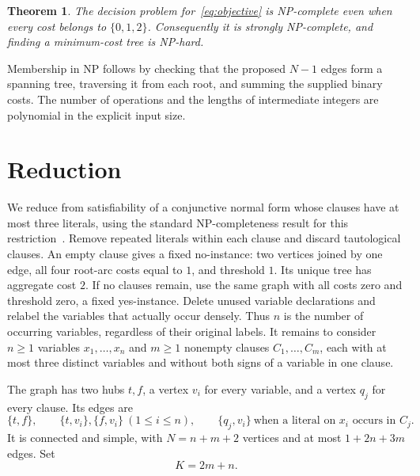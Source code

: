 \documentclass[11pt]{article}
\newtheorem{theorem}{Theorem}
\begin{document}
\begin{theorem}\label{thm:main}
The decision problem for~\eqref{eq:objective} is NP-complete even when
every cost belongs to $\{0,1,2\}$. Consequently it is strongly NP-complete,
and finding a minimum-cost tree is NP-hard.
\end{theorem}

Membership in NP follows by checking that the proposed $N-1$ edges form
a spanning tree, traversing it from each root, and summing the supplied
binary costs. The number of operations and the lengths of intermediate
integers are polynomial in the explicit input size.

\section{Reduction}
We reduce from satisfiability of a conjunctive normal form whose clauses
have at most three literals, using the standard NP-completeness result
for this restriction~\cite{karp}. Remove repeated literals within each
clause and discard tautological clauses. An empty clause gives a fixed
no-instance: two vertices joined by one edge, all four root-arc costs
equal to $1$, and threshold $1$. Its unique tree has aggregate cost $2$.
If no clauses remain, use the same graph with all costs zero and threshold
zero, a fixed yes-instance. Delete unused variable declarations and
relabel the variables that actually occur densely. Thus $n$ is the number
of occurring variables, regardless of their original labels. It remains
to consider $n\geq1$ variables $x_1,\ldots,x_n$ and $m\geq1$ nonempty
clauses $C_1,\ldots,C_m$, each with at most three distinct variables and
without both signs of a variable in one clause.

The graph has two hubs $t,f$, a vertex $v_i$ for every variable, and a
vertex $q_j$ for every clause. Its edges are
\[
 \{t,f\},\qquad \{t,v_i\},\{f,v_i\}\ (1\leq i\leq n),\qquad
 \{q_j,v_i\}\ \text{when a literal on }x_i\text{ occurs in }C_j.
\]
It is connected and simple, with $N=n+m+2$ vertices and at most
$1+2n+3m$ edges. Set
\begin{equation}\label{eq:threshold}
 K=2m+n.
\end{equation}
\end{document}
